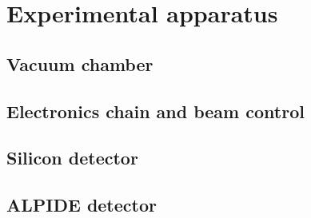 \documentclass[../../main/main.tex]{subfiles}
\begin{document}
\section{Experimental apparatus}



\subsection{Vacuum chamber}



\subsection{Electronics chain and beam control}



\subsection{Silicon detector}



\subsection{ALPIDE detector}
\end{document}
